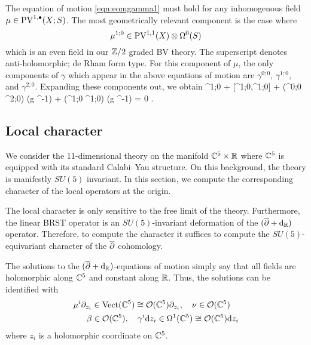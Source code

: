 The equation of motion \eqref{eqn:eomgamma1} must hold for any inhomogenous field $\mu \in {\rm PV}^{1,\bullet}(X;S)$. 
The most geometrically relevant component is the case where 
\[
\mu^{1;0} \in {\rm PV}^{1,1}(X) \otimes \Omega^0(S) 
\]
which is an even field in our $\mathbb Z/2$ graded BV theory.
The superscript denotes anti-holomorphic; de Rham form type. 
For this component of $\mu$, the only components of $\gamma$ which appear in the above equations of motion are $\gamma^{0;0}$, $\gamma^{1;0}$, and $\gamma^{2;0}$.
Expanding these components out, we obtain
\beqn\label{eqn:eomgamma1}
\dbar \mu^{1;0} +  [\mu^{1;0},\mu^{1;0}] + (\del \gamma^{0;0} \wedge \del \gamma^{2;0}) \vee (g \Omega^{-1}) +  (\del \gamma^{1;0} \wedge \del \gamma^{1;0}) \vee (g \Omega^{-1}) = 0 .
\eeqn

\subsection{Local character}

We consider the 11-dimensional theory on the manifold $\mathbb C^5 \times \mathbb R$ where $\mathbb C^5$ is equipped with its standard Calabi--Yau structure. 
On this background, the theory is manifestly $SU(5)$ invariant. 
In this section, we compute the corresponding character of the local operators at the origin. 

The local character is only sensitive to the free limit of the theory.
Furthermore, the linear BRST operator is an $SU(5)$-invariant deformation of the $(\overline{\partial} + {\rm d}_{\mathbb R})$ operator. 
Therefore, to compute the character it suffices to compute the $SU(5)$-equivariant character of the $\overline{\partial}$ cohomology. 

The solutions to the $(\overline{\partial} + {\rm d}_{\mathbb R})$-equations of motion simply say that all fields are holomorphic along $\mathbb C^5$ and constant along $\mathbb R$. 
Thus, the solutions can be identified with 
\begin{align*}
\mu^{i}\partial_{z_i} & \in {\rm Vect}(\mathbb C^5) \cong \mathcal O(\mathbb{C}^5)\partial_{z_i},\quad 
\nu \in \mathcal O (\mathbb{C}^5) \\
\beta & \in \mathcal O (\mathbb{C}^5), \quad \gamma^{i} {\rm d} z_i \in \Omega^{1}(\mathbb C^5) \cong \mathcal O (\mathbb{C}^5){\rm d} z_i 
\end{align*}
where $z_i$ is a holomorphic coordinate on $\mathbb C^5$. 

